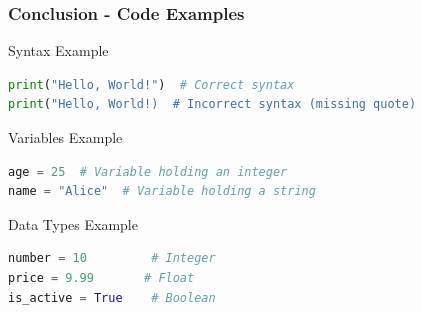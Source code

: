 \documentclass{beamer}
\begin{document}
\begin{frame}[fragile]
    \frametitle{Conclusion - Code Examples}
    \begin{block}{Syntax Example}
        \begin{lstlisting}[language=Python]
print("Hello, World!")  # Correct syntax
print("Hello, World!)  # Incorrect syntax (missing quote)
        \end{lstlisting}
    \end{block}

    \begin{block}{Variables Example}
        \begin{lstlisting}[language=Python]
age = 25  # Variable holding an integer
name = "Alice"  # Variable holding a string
        \end{lstlisting}
    \end{block}

    \begin{block}{Data Types Example}
        \begin{lstlisting}[language=Python]
number = 10         # Integer
price = 9.99       # Float
is_active = True    # Boolean
        \end{lstlisting}
    \end{block}
\end{frame}
\end{document}
